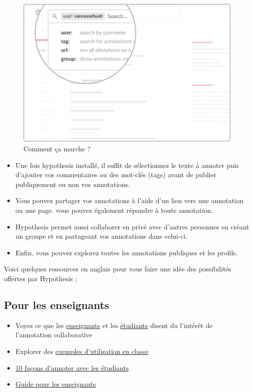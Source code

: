 \documentclass[
]{book}
\providecommand{\tightlist}{%
  \setlength{\itemsep}{0pt}\setlength{\parskip}{0pt}}
\begin{document}
\begin{figure}
\centering
\includegraphics{img/05@2x.png}
\caption{Comment ça marche ?}
\end{figure}

\begin{itemize}
\tightlist
\item
  Une fois hypothesis installé, il suffit de sélectionnez le texte à annoter puis d'ajouter vos commentaires ou des mot-clés (tags) avant de publier publiquement ou non vos annotations.
\item
  Vous pouvez partager vos annotations à l'aide d'un lien vers une annotation ou une page. vous pouvez également répondre à toute annotation.
\item
  Hypothesis permet aussi collaborer en privé avec d'autres personnes en créant un groupe et en partageant vos annotations dans celui-ci.
\item
  Enfin, vous pouvez explorez toutes les annotations publiques et les profils.
\end{itemize}

Voici quelques ressources en anglais pour vous faire une idée des possibilités offertes par Hypothesis :

\hypertarget{pour-les-enseignants}{%
\subsection*{Pour les enseignants}\label{pour-les-enseignants}}

\begin{itemize}
\tightlist
\item
  Voyez ce que les \href{https://web.hypothes.is/teacher-testimonials/}{enseignants} et les \href{https://web.hypothes.is/student-testimonials/}{étudiants} disent du l'intérêt de l'annotation collaborative
\item
  Explorer des \href{https://web.hypothes.is/examples-of-classroom-use/}{exemples d'utilisation en classe}
\item
  \href{https://web.hypothes.is/blog/back-to-school-with-annotation-10-ways-to-annotate-with-students/}{10 façons d'annoter avec les étudiants}
\item
  \href{https://web.hypothes.is/teacher-resource-guide/}{Guide pour les enseignants}
\end{itemize}
\end{document}
